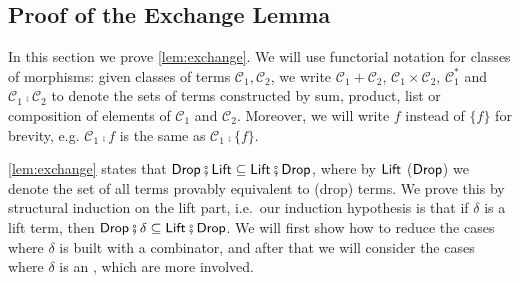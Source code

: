 \subsection{Proof of the Exchange Lemma}\label{sec:appendix:exchange-proof}

In this section we prove \cref{lem:exchange}. We will use functorial notation for classes of morphisms: given classes of terms $\mathcal{C}_1, \mathcal{C}_2$, we write $\mathcal{C}_1 + \mathcal{C}_2$, $\mathcal{C}_1 \times \mathcal{C}_2$, $\mathcal{C}_1^*$ and $\mathcal{C}_1 \comp \mathcal{C}_2$ to denote the sets of terms constructed by sum, product, list or composition of elements of $\mathcal{C}_1$ and $\mathcal{C}_2$. Moreover, we will write $f$ instead of $\{ f\}$ for brevity, e.g. $\mathcal{C}_1 \comp f$ is the same as $\mathcal{C}_1 \comp \{ f \}$.

\cref{lem:exchange} states that $\Drop \comp \Lift \subseteq \Lift \comp \Drop$, where by $\mathsf{Lift}$ ($\mathsf{Drop}$) we denote the set of all terms provably equivalent to  (drop) terms. We prove this by structural induction on the lift part, i.e.~our induction hypothesis is that if $\delta$ is a lift term, then $\Drop \comp \delta \subseteq \Lift \comp \Drop$. We will first show how to reduce the cases where $\delta$ is built with a combinator, and after that we will consider the cases where $\delta$ is an , which are more involved.

